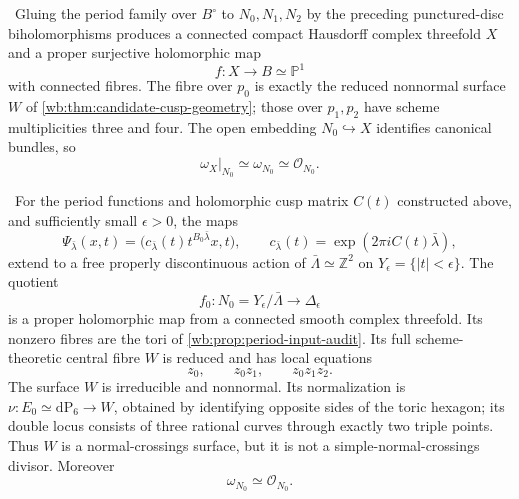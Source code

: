 
\begin{theorem}
\label{wb:thm:candidate-global-geometry}
\ Gluing the period family over \(B^\circ\) to
\(N_0,N_1,N_2\) by the preceding punctured-disc biholomorphisms produces a
connected compact Hausdorff complex threefold \(X\) and a proper surjective
holomorphic map
\[
 f:X\longrightarrow B\simeq\mathbb P^1
\]
with connected fibres.  The fibre over \(p_0\) is exactly the reduced
nonnormal surface \(W\) of \cref{wb:thm:candidate-cusp-geometry}; those over
\(p_1,p_2\) have scheme multiplicities three and four.  The open embedding
\(N_0\hookrightarrow X\) identifies canonical bundles, so
\begin{equation}
 \omega_X|_{N_0}\simeq\omega_{N_0}\simeq\mathcal O_{N_0}.
\label{wb:eq:candidate-global-canonical-on-cusp}
\end{equation}
\end{theorem}

\begin{theorem}
\label{wb:thm:candidate-cusp-geometry}
\ For the period functions and holomorphic cusp matrix \(C(t)\)
constructed above, and sufficiently small \(\epsilon>0\), the maps
\[
 \Psi_{\bar\lambda}(x,t)=
 \bigl(c_{\bar\lambda}(t)t^{B_0\bar\lambda}x,t\bigr),
 \qquad
 c_{\bar\lambda}(t)=\exp(2\pi iC(t)\bar\lambda),
\tag{2.5}
\]
extend to a free properly discontinuous action of
\(\bar\Lambda\simeq\mathbb Z^2\) on
\(Y_\epsilon=\{|t|<\epsilon\}\).  The quotient
\[
 f_0:N_0=Y_\epsilon/\bar\Lambda\longrightarrow\Delta_\epsilon
\]
is a proper holomorphic map from a connected smooth complex threefold.
Its nonzero fibres are the tori of \cref{wb:prop:period-input-audit}.  Its full
scheme-theoretic central fibre \(W\) is reduced and has local equations
\[
 z_0,\qquad z_0z_1,\qquad z_0z_1z_2.
\tag{2.6}
\]
The surface \(W\) is irreducible and nonnormal.  Its normalization is
\(\nu:E_0\simeq\mathrm{dP}_6\to W\), obtained by identifying opposite sides
of the toric hexagon; its double locus consists of three rational curves
through exactly two triple points.  Thus \(W\) is a normal-crossings surface,
but it is not a simple-normal-crossings divisor.  Moreover
\[
 \omega_{N_0}\simeq\mathcal O_{N_0}.
\tag{2.6a}
\]
\end{theorem}

